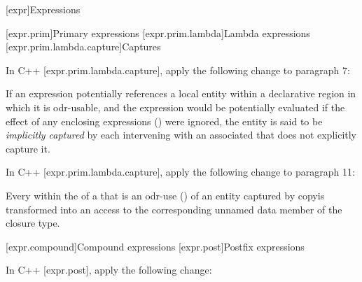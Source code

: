 [expr]{Expressions}

\setcounter{section}{3}
[expr.prim]{Primary expressions}
\setcounter{subsection}{4}
[expr.prim.lambda]{Lambda expressions}
\setcounter{subsubsection}{1}
[expr.prim.lambda.capture]{Captures}

\pnum
In C++ [expr.prim.lambda.capture], apply the following change to paragraph 7:
\begin{std.txt}
If an expression potentially references a local entity within a declarative
region in which it is odr-usable, and the expression would be potentially
evaluated if the effect of any enclosing  expressions
()  were ignored, the entity is said to be
\emph{implicitly captured} by each intervening 
with an associated  that does not explicitly
capture it.
\end{std.txt}

\pnum
In C++ [expr.prim.lambda.capture], apply the following change to paragraph 11:
\begin{std.txt}
Every  within the  of
a  that is an odr-use () of
an entity captured by copyis transformed into an access to the
corresponding unnamed data member of the closure type.
\end{std.txt}

[expr.compound]{Compound expressions}
[expr.post]{Postfix expressions}

\pnum
In C++ [expr.post], apply the following change:

